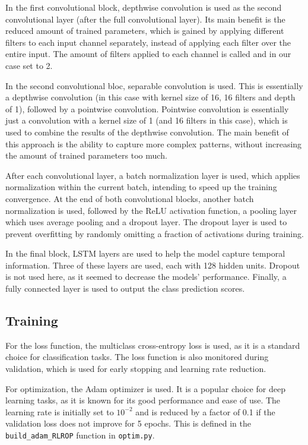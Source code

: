 \documentclass[english, he, bc, kiv, iso690alph, viewonly]{fasthesis}
\begin{document}
In the first convolutional block, depthwise convolution is used as the second convolutional layer (after the full convolutional layer). Its main benefit is the reduced amount of trained parameters, which is gained by applying different filters to each input channel separately, instead of applying each filter over the entire input. The amount of filters applied to each channel is called  and in our case set to 2.

In the second convolutional bloc, separable convolution is used. This is essentially a depthwise convolution (in this case with kernel size of 16, 16 filters and depth of 1), followed by a pointwise convolution. Pointwise convolution is essentially just a convolution with a kernel size of 1 (and 16 filters in this case), which is used to combine the results of the depthwise convolution. The main benefit of this approach is the ability to capture more complex patterns, without increasing the amount of trained parameters too much.

After each convolutional layer, a batch normalization layer is used, which applies normalization within the current batch, intending to speed up the training convergence. At the end of both convolutional blocks, another batch normalization is used, followed by the ReLU activation function, a pooling layer which uses average pooling and a dropout layer. The dropout layer is used to prevent overfitting by randomly omitting a fraction of activations during training.

In the final block, LSTM layers are used to help the model capture temporal information. Three of these layers are used, each with 128 hidden units. Dropout is not used here, as it seemed to decrease the models' performance. Finally, a fully connected layer is used to output the class prediction scores.

\subsection{Training}

For the loss function, the multiclass cross-entropy loss is used, as it is a standard choice for classification tasks. The loss function is also monitored during validation, which is used for early stopping and learning rate reduction.

For optimization, the Adam optimizer is used. It is a popular choice for deep learning tasks, as it is known for its good performance and ease of use. The learning rate is initially set to $10^{-2}$ and is reduced by a factor of 0.1 if the validation loss does not improve for 5 epochs. This is defined in the \texttt{build\_adam\_RLROP} function in \texttt{optim.py}.
\end{document}

